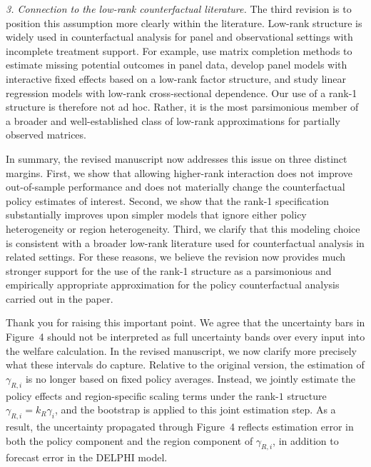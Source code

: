 \documentclass[letterpaper,twoside,11pt]{reviewresponse}
\begin{document}
 \textit{3. Connection to the low-rank counterfactual literature.}  
 The third revision is to position this assumption more clearly within the literature. Low-rank structure is widely used in counterfactual analysis for panel and observational settings with incomplete treatment support. For example, \citet{athey2021matrix} use matrix completion methods to estimate missing potential outcomes in panel data, \citet{bai2009panel} develop panel models with interactive fixed effects based on a low-rank factor structure, and \citet{moon2015linear} study linear regression models with low-rank cross-sectional dependence. Our use of a rank-1 structure is therefore not ad hoc. Rather, it is the most parsimonious member of a broader and well-established class of low-rank approximations for partially observed matrices.
 
 In summary, the revised manuscript now addresses this issue on three distinct margins. First, we show that allowing higher-rank interaction does not improve out-of-sample performance and does not materially change the counterfactual policy estimates of interest. Second, we show that the rank-1 specification substantially improves upon simpler models that ignore either policy heterogeneity or region heterogeneity. Third, we clarify that this modeling choice is consistent with a broader low-rank literature used for counterfactual analysis in related settings. For these reasons, we believe the revision now provides much stronger support for the use of the rank-1 structure as a parsimonious and empirically appropriate approximation for the policy counterfactual analysis carried out in the paper.


Thank you for raising this important point. We agree that the uncertainty bars in Figure~4 should not be interpreted as full uncertainty bands over every input into the welfare calculation. In the revised manuscript, we now clarify more precisely what these intervals do capture. Relative to the original version, the estimation of $\gamma_{R,i}$ is no longer based on fixed policy averages. Instead, we jointly estimate the policy effects and region-specific scaling terms under the rank-$1$ structure $\gamma_{R,i}=k_R\gamma_i$, and the bootstrap is applied to this joint estimation step. As a result, the uncertainty propagated through Figure~4 reflects estimation error in both the policy component and the region component of $\gamma_{R,i}$, in addition to forecast error in the DELPHI model.
\end{document}
